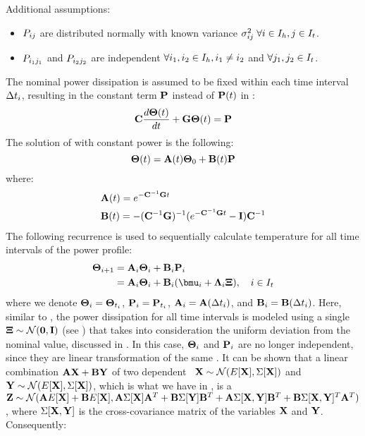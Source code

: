 Additional assumptions:
\begin{itemize}
  \item $P_{ij}$ are distributed normally with known variance $\sigma_{ij}^2 \; \forall i \in I_h, j \in I_t$.
  \item $P_{i_1 j_1}$ and $P_{i_2 j_2}$ are independent $\forall i_1, i_2 \in I_h,  i_1 \neq i_2$ and $\forall j_1, j_2 \in I_t$.
\end{itemize}

The nominal power dissipation is assumed to be fixed within each time interval $\Delta t_i$, resulting in the constant term $\mathbf{P}$ instead of $\mathbf{P}(t)$ in :
\begin{equation} \equlabel{fourier-constant-power}
  \mcapacitance \frac{d\vtemperature(\time)}{d\time} + \mconductance \vtemperature(\time) = \vpower
\end{equation}
The solution of  with constant power is the following:
\[
  \mathbf{\Theta}(t) = \mathbf{A}(t) \mathbf{\Theta}_0 + \mathbf{B}(t) \mathbf{P}
\]
where:
\begin{align}
  & \m{A}(\time) = \emcg{\time} \equlabel{a} \\
  & \m{B}(\time) = -(\cg)^{-1}(\emcg{\time} - \mone) \mcapacitance^{-1} \equlabel{b}
\end{align}
The following recurrence is used to sequentially calculate temperature for all time intervals of the power profile:
\begin{align}
  \vtemperature_{i + 1} & = \m{A}_i \vtemperature_i + \m{B}_i \vpower_i \nonumber \\
  & = \m{A}_i \vtemperature_i + \m{B}_i (\vmean{i} + \ddeviation{i} \vstdnormal), \sep i \in \timeindex \equlabel{tta-fourier-recurrence}
\end{align}
where we denote $\mathbf{\Theta}_i = \mathbf{\Theta}_{t_i}$, $\mathbf{P}_i = \mathbf{P}_{t_i}$, $\mathbf{A}_i = \mathbf{A}(\Delta t_i)$, and $\mathbf{B}_i = \mathbf{B}(\Delta t_i)$. Here, similar to , the power dissipation for all time intervals is modeled using a single \msnrv\ $\mathbf{\Xi} \sim \mathcal{N}(\mathbf{0}, \mathbf{I})$ (see ) that takes into consideration the uniform deviation from the nominal value, discussed in . In this case, $\mathbf{\Theta}_i$ and $\mathbf{P}_i$ are no longer independent, since they are linear transformation of the same \mrv. It can be shown that a linear combination $\mathbf{A} \mathbf{X} + \mathbf{B} \mathbf{Y}$ of two dependent \mnrvs\ $\mathbf{X} \sim \mathcal{N}(E[\mathbf{X}], \Sigma[\mathbf{X}])$ and $\mathbf{Y} \sim \mathcal{N}(E[\mathbf{X}], \Sigma[\mathbf{X}])$, which is what we have in , is a \mnrv\ $\mathbf{Z} \sim \mathcal{N}(\mathbf{A} E[\mathbf{X}] + \mathbf{B} E[\mathbf{X}], \mathbf{A} \Sigma[\mathbf{X}] \mathbf{A}^T + \mathbf{B} \Sigma[\mathbf{Y}] \mathbf{B}^T + \mathbf{A} \Sigma[\mathbf{X}, \mathbf{Y}] \mathbf{B}^T + \mathbf{B} \Sigma[\mathbf{X}, \mathbf{Y}]^T \mathbf{A}^T)$, where $\Sigma[\mathbf{X}, \mathbf{Y}]$ is the cross-covariance matrix of the variables $\mathbf{X}$ and $\mathbf{Y}$. Consequently:
